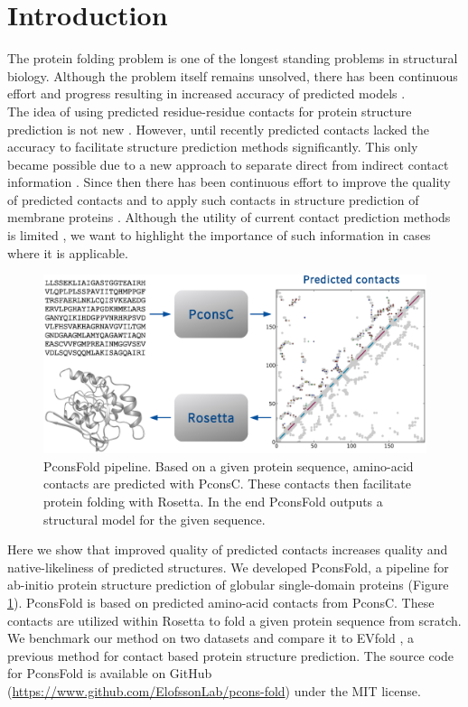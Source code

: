 \documentclass{bioinfo}
\begin{document}
\section{Introduction}
The protein folding problem is one of the longest standing problems in structural biology. Although the problem itself remains unsolved, there has been continuous effort and progress resulting in increased accuracy of predicted models \cite[]{kryshtafovych_CASP10_2013}. \\\indent
The idea of using predicted residue-residue contacts for protein structure prediction is not new \cite[]{CITATIONNEEDED}. However, until recently \cite[]{marks_protein_2011} predicted contacts lacked the accuracy to facilitate structure prediction methods significantly. This only became possible due to a new approach to separate direct from indirect contact information \cite[]{burger_disentangling_2010}. Since then there has been continuous effort to improve the quality of predicted contacts \cite[]{morcos_direct-coupling_2011, jones_PSICOV:_2012, ekeberg_improved_2013, skwark_PconsC:_2013} and to apply such contacts in structure prediction of membrane proteins \cite[]{hopf_three-dimensional_2012, nugent_accurate_2012}. Although the utility of current contact prediction methods is limited \cite[]{kamisetty_assessing_2013}, we want to highlight the importance of such information in cases where it is applicable. \\\indent
\begin{figure}[!tpb]%
\centerline{\includegraphics[scale=0.35]{figures/pipeline.eps}}
\caption{PconsFold pipeline. Based on a given protein sequence, amino-acid contacts are predicted with PconsC. These contacts then facilitate protein folding with Rosetta. In the end PconsFold outputs a structural model for the given sequence.}\label{fig:pipeline}
\end{figure}
Here we show that improved quality of predicted contacts increases quality and native-likeliness of predicted structures. We developed PconsFold, a pipeline for ab-initio protein structure prediction of globular single-domain proteins (Figure \ref{fig:pipeline}). PconsFold is based on predicted amino-acid contacts from PconsC. These contacts are utilized within Rosetta to fold a given protein sequence from scratch. We benchmark our method on two datasets and compare it to EVfold \cite[]{marks_protein_2011}, a previous method for contact based protein structure prediction. The source code for PconsFold is available on GitHub (\url{https://www.github.com/ElofssonLab/pcons-fold}) under the MIT license.
\end{document}
